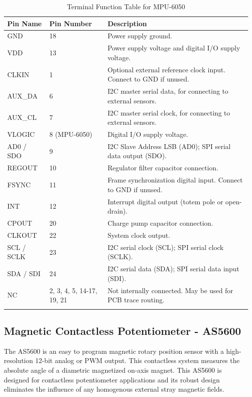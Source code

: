 \documentclass[english,project]{buwthesis}
\begin{document}
\begin{longtable}{|l|l|p{10cm}|}
\hline
\textbf{Pin Name} & \textbf{Pin Number} & \textbf{Description} \\ \hline
GND & 18 & Power supply ground. \\ \hline
VDD & 13 & Power supply voltage and digital I/O supply voltage. \\ \hline
CLKIN & 1 & Optional external reference clock input. Connect to GND if unused. \\ \hline
AUX\_DA & 6 & I2C master serial data, for connecting to external sensors. \\ \hline
AUX\_CL & 7 & I2C master serial clock, for connecting to external sensors. \\ \hline
VLOGIC & 8 (MPU-6050) & Digital I/O supply voltage. \\ \hline
AD0 / SDO & 9 & I2C Slave Address LSB (AD0); SPI serial data output (SDO). \\ \hline
REGOUT & 10 & Regulator filter capacitor connection. \\ \hline
FSYNC & 11 & Frame synchronization digital input. Connect to GND if unused. \\ \hline
INT & 12 & Interrupt digital output (totem pole or open-drain). \\ \hline
CPOUT & 20 & Charge pump capacitor connection. \\ \hline
CLKOUT & 22 & System clock output. \\ \hline
SCL / SCLK & 23 & I2C serial clock (SCL); SPI serial clock (SCLK). \\ \hline
SDA / SDI & 24 & I2C serial data (SDA); SPI serial data input (SDI). \\ \hline
NC & 2, 3, 4, 5, 14-17, 19, 21 & Not internally connected. May be used for PCB trace routing. \\ \hline
\caption{Terminal Function Table for MPU-6050\cite{mpu6050datasheet}}
\label{tab:mpu6050_terminal_functions}
\end{longtable}



\subsection{Magnetic Contactless Potentiometer - AS5600}

The AS5600 is an easy to program magnetic rotary position sensor with a high-resolution 12-bit analog or PWM output. This contactless system measures the absolute angle of a diametric magnetized on-axis magnet. This AS5600 is designed for contactless potentiometer applications and its robust design eliminates the influence of any homogenous external stray magnetic fields.\cite{AS5600Datasheet}
\end{document}
